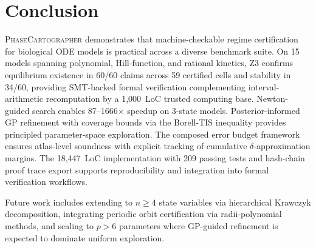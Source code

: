 \documentclass[11pt]{article}
\newcommand{\PC}{\textsc{PhaseCartographer}}
\begin{document}
\section{Conclusion}
\label{sec:conclusion}

\PC{} demonstrates that machine-checkable regime certification for biological ODE models is practical across a diverse benchmark suite.
On 15 models spanning polynomial, Hill-function, and rational kinetics, Z3 confirms equilibrium existence in 60/60 claims across 59 certified cells and stability in 34/60, providing SMT-backed formal verification complementing interval-arithmetic recomputation by a 1{,}000~LoC trusted computing base.
Newton-guided search enables 87--1666$\times$ speedup on 3-state models.
Posterior-informed GP refinement with coverage bounds via the Borell-TIS inequality provides principled parameter-space exploration.
The composed error budget framework ensures atlas-level soundness with explicit tracking of cumulative $\delta$-approximation margins.
The 18{,}447~LoC implementation with 209 passing tests and hash-chain proof trace export supports reproducibility and integration into formal verification workflows.

Future work includes extending to $n \geq 4$ state variables via hierarchical Krawczyk decomposition, integrating periodic orbit certification via radii-polynomial methods, and scaling to $p > 6$ parameters where GP-guided refinement is expected to dominate uniform exploration.
\end{document}

